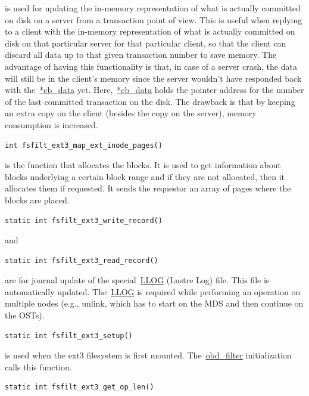 is used for updating the in-memory representation of what is actually committed
on disk on a server from a transaction point of view. This is useful when
replying to a client with the in-memory representation of what is actually
committed on disk on that particular server for that particular client, so that
the client can discard all data up to that given transaction number to save
memory. The advantage of having this functionality is that, in case of a server
crash, the data will still be in the client's memory since the server wouldn't have
responded back with the~\url{*cb_data} yet. Here,~\url{*cb_data} holds the
pointer address for the number of the last committed transaction on the disk. The drawback
is that by keeping an extra copy on the client (besides the copy on the server), memory consumption is increased.

\begin{Verbatim}
int fsfilt_ext3_map_ext_inode_pages()
\end{Verbatim}

is the function that allocates the blocks. It is used to get
information about blocks underlying a certain block range and if they are not
allocated, then it allocates them if requested. It sends the requestor an array of
pages where the blocks are placed. 

\begin{Verbatim}
static int fsfilt_ext3_write_record()
\end{Verbatim}

and

\begin{Verbatim}
static int fsfilt_ext3_read_record()
\end{Verbatim}

are for journal update of the special~\url{LLOG} (Lustre Log) file. This file
is automatically updated. The~\url{LLOG} is required while performing an operation
on multiple nodes (e.g., unlink, which has to start on the MDS and then continue
on the OSTs). 

\begin{Verbatim}
static int fsfilt_ext3_setup()
\end{Verbatim}

is used when the ext3 filesystem is first mounted. The~\url{obd_filter}
initialization calls this function.

\begin{Verbatim}
static int fsfilt_ext3_get_op_len()
\end{Verbatim}

